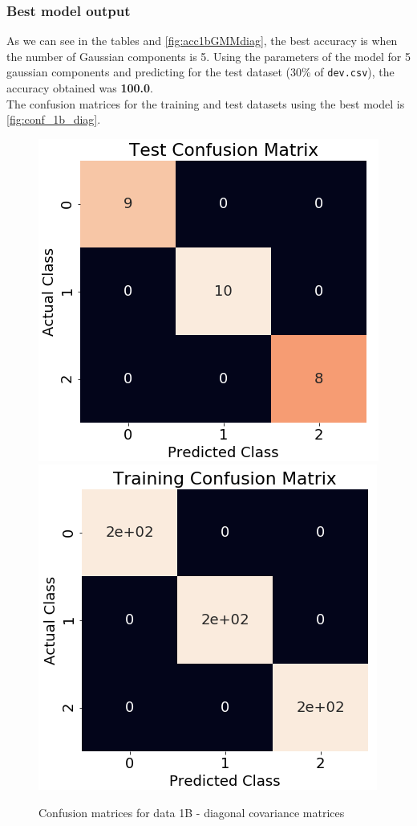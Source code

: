 \documentclass[11pt,a4paper]{article}
\def\tt#1{\texttt{#1}}
\begin{document}
\subsubsection{Best model output}
As we can see in the tables and \autoref{fig:acc1bGMMdiag}, the best accuracy is when the number of Gaussian components is 5. Using the parameters of the model for 5 gaussian components and predicting for the test dataset (30\% of \tt{dev.csv}), the accuracy obtained was \textbf{100.0}.\\
The confusion matrices for the training and test datasets using the best model is \autoref{fig:conf_1b_diag}.
\begin{figure}[H]
    \centering
    \includegraphics[scale=0.45]{images/conf_test1b.png}
    \includegraphics[scale=0.45]{images/conf_train1b.png}
    \caption{Confusion matrices for data 1B - diagonal covariance matrices}
    \label{fig:conf_1b_diag}
\end{figure}
\end{document}
